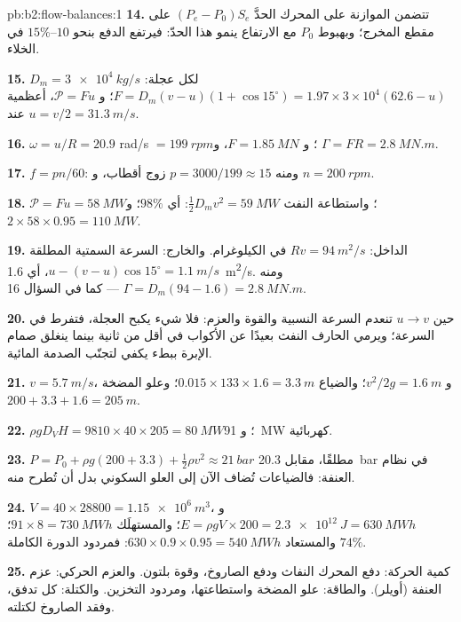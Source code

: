 \begin{solution}{pb:b2:flow-balances:1}
\textbf{14.} تتضمن الموازنة على المحرك الحدَّ $(P_e - P_0)S_e$ على
مقطع المخرج؛ وبهبوط $P_0$ مع الارتفاع ينمو هذا الحدّ: فيرتفع الدفع
بنحو $10$--$15\%$ في الخلاء.

\textbf{15.} $D_m = \qty{3e4}{kg/s}$ لكل عجلة: $F = D_m(v - u)(1 + \cos15^\circ) =
1.97 \times 3 \times 10^4(62.6 - u)$؛ و $\mathcal P = Fu$، أعظمية عند $u = v/2 = \qty{31.3}{m/s}$.

\textbf{16.} $\omega = u/R = 20.9$ rad/s $= \qty{199}{rpm}$؛ و $F = \qty{1.85}{MN}$، و $\Gamma = FR
= \qty{2.8}{MN.m}$.

\textbf{17.} $f = pn/60$: ومنه $p = 3000/199 \approx 15$ زوج أقطاب، و $n = \qty{200}{rpm}$.

\textbf{18.} $\mathcal P = Fu = \qty{58}{MW}$؛ واستطاعة النفث $\tfrac12D_mv^2 = \qty{59}{MW}$:
أي $98\%$؛ و $2 \times 58 \times 0.95 = \qty{110}{MW}$.

\textbf{19.} الداخل: $Rv = \qty{94}{m^2/s}$ في الكيلوغرام. والخارج: السرعة السمتية المطلقة
$u - (v - u)\cos15^\circ = \qty{1.1}{m/s}$، أي \qty{1.6}{m^2/s}. ومنه $\Gamma = D_m(94 -
1.6) = \qty{2.8}{MN.m}$ --- كما في السؤال 16.

\textbf{20.} حين $u \to v$ تنعدم السرعة النسبية والقوة والعزم:
فلا شيء يكبح العجلة، فتفرط في السرعة؛ ويرمي الحارف
النفث بعيدًا عن الأكواب في أقل من ثانية بينما ينغلق صمام الإبرة
ببطء يكفي لتجنّب الصدمة المائية.

\textbf{21.} $v = \qty{5.7}{m/s}$، و $v^2/2g = \qty{1.6}{m}$؛ والضياع $0.015 \times 133 \times 1.6 =
\qty{3.3}{m}$؛ وعلو المضخة $200 + 3.3 + 1.6 = \qty{205}{m}$.

\textbf{22.} $\rho gD_VH = 9810 \times 40 \times 205 = \qty{80}{MW}$؛ و \qty{91}{MW} كهربائية.

\textbf{23.} $P = P_0 + \rho g(200 + 3.3) + \tfrac12\rho v^2 \approx \qty{21}{bar}$ مطلقًا،
مقابل \qty{20.3}{bar} في نظام العنفة: فالضياعات تُضاف الآن إلى
العلو السكوني بدل أن تُطرح منه.

\textbf{24.} $V = 40 \times 28800 = \qty{1.15e6}{m^3}$، و $E = \rho gV \times 200 = \qty{2.3e12}{J}
= \qty{630}{MWh}$؛ والمستهلَك $91 \times 8 = \qty{730}{MWh}$؛ والمستعاد $630 \times 0.9 \times
0.95 = \qty{540}{MWh}$: فمردود الدورة الكاملة $74\%$.

\textbf{25.} كمية الحركة: دفع المحرك النفاث ودفع الصاروخ، وقوة
بلتون. والعزم الحركي: عزم العنفة (أويلر). والطاقة:
علو المضخة واستطاعتها، ومردود التخزين. والكتلة: كل تدفق،
وفقد الصاروخ لكتلته.
\end{solution}
